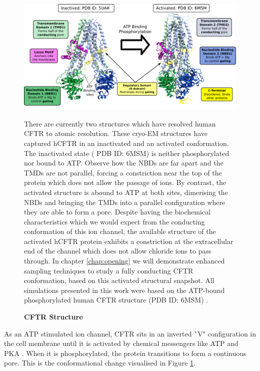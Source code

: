 \begin{figure}
	\begin{center}
	\includegraphics[width=\textwidth]{figures/CFTR_structure.pdf}
	\end{center}
	\label{CFTR_structure_domains}
	\captionsetup{singlelinecheck = false, justification=raggedright}
	\caption[CFTR Structure] {\textbf{CFTR Structure}}{There are currently two structures which have resolved human CFTR to atomic resolution. These cryo-EM structures have captured hCFTR in an inactivated and an activated conformation. The inactivated state ( PDB ID: 6MSM) is neither phosphorylated nor bound to ATP. Observe how the NBDs are far apart and the TMDs are not parallel, forcing a constriction near the top of the protein which does not allow the passage of ions. By contrast, the activated structure is abound to ATP at both sites, dimerising the NBDs and bringing the TMDs into a parallel configuration where they are able to form a pore. Despite having the biochemical characteristics which we would expect from the conducting conformation of this ion channel, the available structure of the activated hCFTR protein exhibits a constriction at the extracellular end of the channel which does not allow chloride ions to pass through. In chapter \ref{chap:opening} we will demonstrate enhanced sampling techniques to study a fully conducting CFTR conformation, based on this activated structural snapshot. All simulations presented in this work were based on the ATP-bound phosphorylated human CFTR structure (PDB ID: 6MSM) \cite{zhang2018}.} 

\end{figure}

As an ATP stimulated ion channel, CFTR sits in an inverted \``V" configuration in the cell membrane until it is activated by chemical messengers like ATP and PKA \cite{zhang2018, gadsby2006, mihalyi2020}. When it is phosphorylated, the protein transitions to form a continuous pore. This is the conformational change visualised in Figure \ref{CFTR_structure_domains}.

